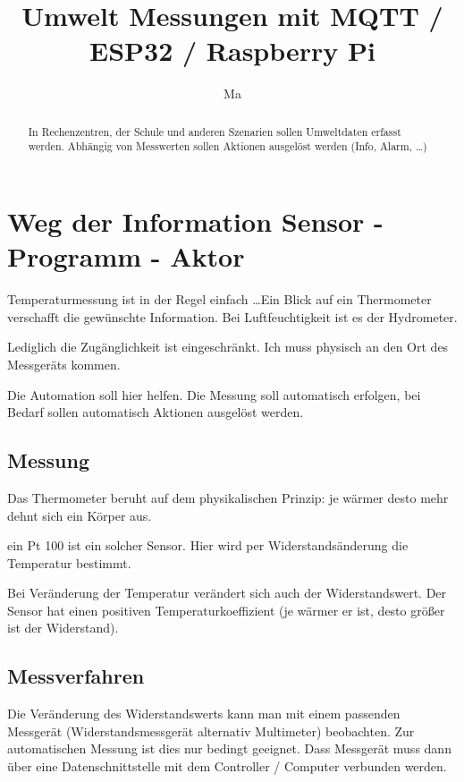 \documentclass[paper = a4]{scrartcl}
\title{Umwelt Messungen mit MQTT / ESP32 / Raspberry Pi}
\author{Ma}
\begin{document}
\maketitle

\begin{abstract}
In Rechenzentren, der Schule und anderen Szenarien sollen Umweltdaten erfasst werden. Abhängig von Messwerten sollen Aktionen ausgelöst werden (Info, Alarm, \dots)


\end{abstract}

\section{Weg der Information Sensor - Programm - Aktor}
Temperaturmessung ist in der Regel einfach \dots Ein Blick auf ein Thermometer verschafft die gewünschte Information. Bei Luftfeuchtigkeit ist es der Hydrometer.

Lediglich die Zugänglichkeit ist eingeschränkt. Ich muss physisch an den Ort des Messgeräts kommen.

Die Automation soll hier helfen. Die Messung soll automatisch erfolgen, bei Bedarf sollen automatisch Aktionen ausgelöst werden.

\subsection{Messung}
Das Thermometer beruht auf dem physikalischen Prinzip: je wärmer desto mehr dehnt sich ein Körper aus.

ein Pt 100 ist ein solcher Sensor. Hier wird per Widerstandsänderung die Temperatur bestimmt.

Bei Veränderung der Temperatur verändert sich auch der Widerstandswert. Der Sensor hat einen positiven Temperaturkoeffizient (je wärmer er ist, desto größer ist der Widerstand).


\subsection{Messverfahren}
Die Veränderung des Widerstandswerts kann man mit einem passenden Messgerät (Widerstandsmessgerät alternativ Multimeter) beobachten. Zur automatischen Messung ist dies nur bedingt geeignet. Dass Messgerät muss dann über eine Datenschnittstelle mit dem Controller / Computer verbunden werden.
\end{document}
